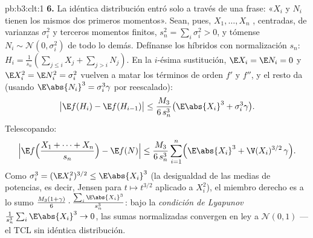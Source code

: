 \begin{solution}{pb:b3:clt:1}
\textbf{6.} La idéntica distribución entró solo a través de una frase:
«$X_i$ y $N_i$ tienen los mismos dos primeros momentos». Sean, pues,
$X_1, \dots, X_n$
, centradas, de
varianzas $\sigma_i^2$ y terceros momentos finitos,
$s_n^2 = \sum_i\sigma_i^2 > 0$, y tómense $N_i \sim
\mathcal N(0, \sigma_i^2)$
 de todo lo
demás. Defínanse los híbridos con normalización $s_n$: $H_i =
\frac1{s_n}(\sum_{j\leq i}X_j + \sum_{j>i}N_j)$. En la $i$-ésima
sustitución, $\E X_i = \E N_i = 0$ y $\E X_i^2 = \E N_i^2
= \sigma_i^2$ vuelven a matar los términos de orden $f'$ y $f''$, y el
resto da (usando $\E\abs{N_i}^3 = \sigma_i^3\gamma$ por reescalado):
\[
\bigl|\E f(H_i) - \E f(H_{i-1})\bigr| \leq
\frac{M_3}{6\,s_n^3}\bigl(\E\abs{X_i}^3 +
\sigma_i^3\gamma\bigr) .
\]
Telescopando:
\[
\Bigl|\E f\Bigl(\frac{X_1 + \dots + X_n}{s_n}\Bigr) -
\E f(N)\Bigr| \leq \frac{M_3}{6\,s_n^3}\sum_{i=1}^n
\Bigl(\E\abs{X_i}^3 + \V(X_i)^{3/2}\,\gamma\Bigr) .
\]
Como $\sigma_i^3 = (\E X_i^2)^{3/2} \leq \E\abs{X_i}^3$ (la desigualdad
de las medias de potencias, es decir, Jensen para $t \mapsto
t^{3/2}$ aplicado a $X_i^2$), el miembro derecho es a lo sumo
$\frac{M_3(1 + \gamma)}{6}\cdot
\frac{\sum_i\E\abs{X_i}^3}{s_n^3}$: bajo la \emph{condición de Lyapunov}
$\frac1{s_n^3}\sum_i\E\abs{X_i}^3 \to 0$, las sumas normalizadas
convergen en ley a $\mathcal N(0,1)$ --- el TCL sin idéntica
distribución.


\end{solution}
